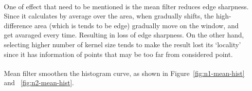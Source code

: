 \documentclass[12pt,a4paper]{report}
\begin{document}
\paragraph*{}One of effect that need to be mentioned is the mean filter reduces edge sharpness. Since it calculates by average over the area, when gradually shifts, the high-difference area (which is tends to be edge) gradually move on the window, and get avaraged every time. Resulting in loss of edge sharpness.
On the other hand, selecting higher number of kernel size tends to make the result lost its `locality' since it has information of points that may be too far from considered point. 
\paragraph*{}Mean filter smoothen the histogram curve, as shown in Figure~\ref{fig:n1-mean-hist} and ~\ref{fig:n2-mean-hist}.
\end{document}
